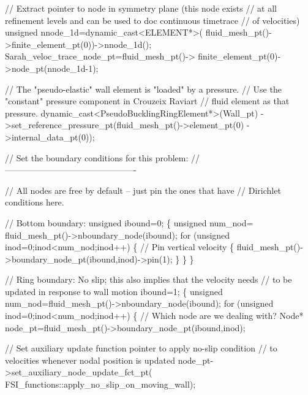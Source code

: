 \begin{DoxyCodeInclude}
 \textcolor{comment}{//  Extract pointer to node in symmetry plane (this node exists}
 \textcolor{comment}{// at all refinement levels and can be used to doc continuous timetrace}
 \textcolor{comment}{// of velocities)}
 \textcolor{keywordtype}{unsigned} nnode\_1d=\textcolor{keyword}{dynamic\_cast<}ELEMENT*\textcolor{keyword}{>}(
  fluid\_mesh\_pt()->finite\_element\_pt(0))->nnode\_1d();
 Sarah\_veloc\_trace\_node\_pt=fluid\_mesh\_pt()->
  finite\_element\_pt(0)->node\_pt(nnode\_1d-1);

 \textcolor{comment}{// The "pseudo-elastic" wall element is "loaded" by a pressure.}
 \textcolor{comment}{// Use the "constant" pressure component in Crouzeix Raviart}
 \textcolor{comment}{// fluid element as that pressure. }
 \textcolor{keyword}{dynamic\_cast<}PseudoBucklingRingElement*\textcolor{keyword}{>}(Wall\_pt)
  ->set\_reference\_pressure\_pt(fluid\_mesh\_pt()->element\_pt(0)
                              ->internal\_data\_pt(0));


 \textcolor{comment}{// Set the boundary conditions for this problem:}
 \textcolor{comment}{//----------------------------------------------}

 \textcolor{comment}{// All nodes are free by default -- just pin the ones that have }
 \textcolor{comment}{// Dirichlet conditions here. }
 
 \textcolor{comment}{// Bottom boundary: }
 \textcolor{keywordtype}{unsigned} ibound=0;
  \{
   \textcolor{keywordtype}{unsigned} num\_nod= fluid\_mesh\_pt()->nboundary\_node(ibound);
   \textcolor{keywordflow}{for} (\textcolor{keywordtype}{unsigned} inod=0;inod<num\_nod;inod++)
    \{
     \textcolor{comment}{// Pin vertical velocity}
     \{
       fluid\_mesh\_pt()->boundary\_node\_pt(ibound,inod)->pin(1); 
     \}
    \}
  \}
  
 \textcolor{comment}{// Ring boundary: No slip; this also implies that the velocity needs}
 \textcolor{comment}{// to be updated in response to wall motion}
 ibound=1;
  \{
   \textcolor{keywordtype}{unsigned} num\_nod=fluid\_mesh\_pt()->nboundary\_node(ibound);
   \textcolor{keywordflow}{for} (\textcolor{keywordtype}{unsigned} inod=0;inod<num\_nod;inod++)
    \{
     \textcolor{comment}{// Which node are we dealing with?}
     Node* node\_pt=fluid\_mesh\_pt()->boundary\_node\_pt(ibound,inod);

     \textcolor{comment}{// Set auxiliary update function pointer to apply no-slip condition}
     \textcolor{comment}{// to velocities whenever nodal position is updated}
     node\_pt->set\_auxiliary\_node\_update\_fct\_pt(
      FSI\_functions::apply\_no\_slip\_on\_moving\_wall);
     

\end{DoxyCodeInclude}
